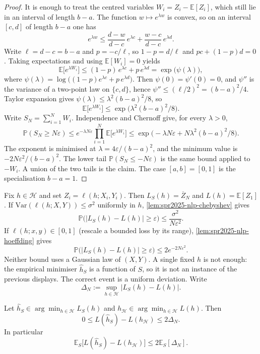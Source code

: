 \documentclass[11pt,a4paper]{article}
\theoremstyle{definition}
\begin{document}
\begin{proof}
It is enough to treat the centred variables \(W_i=Z_i-\mathbb{E}[Z_i]\), which still lie in an interval of length \(b-a\). The function \(w\mapsto e^{\lambda w}\) is convex, so on an interval \([c,d]\) of length \(b-a\) one has
\[
e^{\lambda w}
\le
\frac{d-w}{d-c}\,e^{\lambda c}+\frac{w-c}{d-c}\,e^{\lambda d}.
\]
Write \(\ell=d-c=b-a\) and \(p=-c/\ell\), so \(1-p=d/\ell\) and \(pc+(1-p)d=0\). Taking expectations and using \(\mathbb{E}[W_i]=0\) yields
\[
\mathbb{E}\bigl[e^{\lambda W_i}\bigr]
\le
(1-p)\,e^{\lambda c}+p\,e^{\lambda d}
=\exp\bigl(\psi(\lambda)\bigr),
\]
where \(\psi(\lambda)=\log\bigl((1-p)e^{\lambda c}+p\,e^{\lambda d}\bigr)\). Then \(\psi(0)=\psi'(0)=0\), and \(\psi''\) is the variance of a two-point law on \(\{c,d\}\), hence \(\psi''\le(\ell/2)^2=(b-a)^2/4\). Taylor expansion gives \(\psi(\lambda)\le\lambda^2(b-a)^2/8\), so
\[
\mathbb{E}\bigl[e^{\lambda W_i}\bigr]
\le
\exp\bigl(\lambda^2(b-a)^2/8\bigr).
\]
Write \(S_N=\sum_{i=1}^{N}W_i\). Independence and Chernoff give, for every \(\lambda>0\),
\[
\mathbb{P}(S_N\ge N\varepsilon)
\le
e^{-\lambda N\varepsilon}\prod_{i=1}^{N}\mathbb{E}\bigl[e^{\lambda W_i}\bigr]
\le
\exp\bigl(-\lambda N\varepsilon+N\lambda^2(b-a)^2/8\bigr).
\]
The exponent is minimised at \(\lambda=4\varepsilon/(b-a)^2\), and the minimum value is \(-2N\varepsilon^2/(b-a)^2\). The lower tail \(\mathbb{P}(S_N\le -N\varepsilon)\) is the same bound applied to \(-W_i\). A union of the two tails is the claim. The case \([a,b]=[0,1]\) is the specialisation \(b-a=1\).
\end{proof}

Fix \(h\in\mathcal{H}\) and set \(Z_i=\ell(h;X_i,Y_i)\). Then \(L_S(h)=\overline{Z}_N\) and \(L(h)=\mathbb{E}[Z_1]\). If \(\mathrm{Var}(\ell(h;X,Y))\le\sigma^2\) uniformly in \(h\), \cref{lem:spr2025-nlp-chebyshev} gives
\[
\mathbb{P}\bigl(\lvert L_S(h)-L(h)\rvert\ge\varepsilon\bigr)
\le
\frac{\sigma^2}{N\varepsilon^2}.
\]
If \(\ell(h;x,y)\in[0,1]\) (rescale a bounded loss by its range), \cref{lem:spr2025-nlp-hoeffding} gives
\[
\mathbb{P}\bigl(\lvert L_S(h)-L(h)\rvert\ge\varepsilon\bigr)
\le
2e^{-2N\varepsilon^2}.
\]
Neither bound uses a Gaussian law of \((X,Y)\). A single fixed \(h\) is not enough: the empirical minimiser \(\widehat h_S\) is a function of \(S\), so it is not an instance of the previous displays. The correct event is a uniform deviation. Write
\[
\Delta_N
:=\sup_{h\in\mathcal{H}}\lvert L_S(h)-L(h)\rvert.
\]

\begin{lemma}
\label{lem:spr2025-nlp-erm-unif}
Let \(\widehat h_S\in\arg\min_{h\in\mathcal{H}}L_S(h)\) and \(h_{\mathcal{H}}\in\arg\min_{h\in\mathcal{H}}L(h)\). Then
\[
0
\le
L(\widehat h_S)-L(h_{\mathcal{H}})
\le
2\Delta_N.
\]
In particular
\[
\mathbb{E}_S\bigl[L(\widehat h_S)-L(h_{\mathcal{H}})\bigr]
\le
2\mathbb{E}_S[\Delta_N].
\]
\end{lemma}
\end{document}
